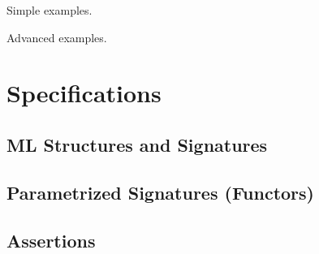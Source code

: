 Simple examples.

Advanced examples.

\section{Specifications}
\label{sec:specifications}

\subsection{ML Structures and Signatures}
\label{sec:ml-signatures}


\subsection{Parametrized Signatures (Functors)}
\label{sec:param-sign}


\subsection{Assertions}
\label{sec:assertions}




